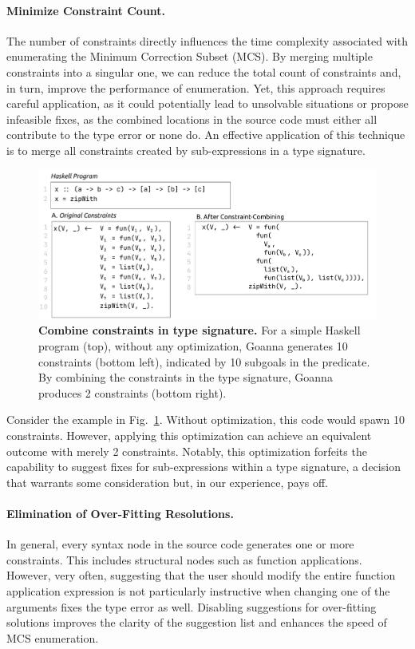     \paragraph{Minimize Constraint Count.}
    The number of constraints directly influences the time complexity associated with enumerating the Minimum Correction Subset (MCS). By merging multiple constraints into a singular one, we can reduce the total count of constraints and, in turn, improve the performance of enumeration. Yet, this approach requires careful application, as it could potentially lead to unsolvable situations or propose infeasible fixes, as the combined locations in the source code must either all contribute to the type error or none do. An effective application of this technique is to merge all constraints created by sub-expressions in a type signature.

   \begin{figure}[htb!]
        \centering
        \includegraphics[width=\linewidth]{images/Combine-Constraints}
        \caption{\textbf{Combine constraints in type signature.} For a simple Haskell program (top),  without any optimization, Goanna generates 10 constraints (bottom left), indicated by 10 subgoals in the predicate. By combining the constraints in the type signature, Goanna produces 2 constraints (bottom right).}
        \label{fig:combine-constraints}
    \end{figure}

    Consider the example in Fig.~\ref{fig:combine-constraints}. Without optimization, this code would spawn 10 constraints. However, applying this optimization can achieve an equivalent outcome with merely 2 constraints. Notably, this optimization forfeits the capability to suggest fixes for sub-expressions within a type signature, a decision that warrants some consideration but, in our experience, pays off.

    \paragraph{Elimination of Over-Fitting Resolutions.}
    In general, every syntax node in the source code generates one or more constraints. This includes structural nodes such as function applications. However, very often, suggesting that the user should modify the entire function application expression is not particularly instructive when changing one of the arguments fixes the type error as well. Disabling suggestions for over-fitting solutions improves the clarity of the suggestion list and enhances the speed of MCS enumeration.
   

